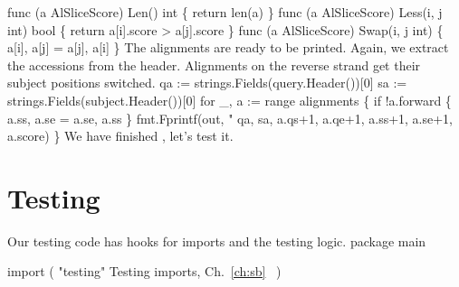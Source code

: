 \nwenddocs{}\plusendmoddef\nwstartdeflinemarkup{}\nwenddeflinemarkup
func (a AlSliceScore) Len() int \{
          return len(a)
\}
func (a AlSliceScore) Less(i, j int) bool \{
          return a[i].score > a[j].score
\}
func (a AlSliceScore) Swap(i, j int) \{
          a[i], a[j] = a[j], a[i]
\}
\nwendcode{}\nwdocspar
The alignments are ready to be printed. Again, we extract the
accessions from the header. Alignments on the reverse strand get their
subject positions switched.
\nwenddocs{}\endmoddef\nwstartdeflinemarkup{}\nwenddeflinemarkup
qa := strings.Fields(query.Header())[0]
sa := strings.Fields(subject.Header())[0]
for _, a := range alignments \{
          if !a.forward \{
                  a.ss, a.se = a.se, a.ss
          \}
          fmt.Fprintf(out, "%
                  qa, sa, a.qs+1, a.qe+1, a.ss+1, a.se+1, a.score)
\}
\nwendcode{}\nwdocspar
We have finished , let's test it.

\section*{Testing}
Our testing code has hooks for imports and the testing logic.
\nwenddocs{}\endmoddef\nwstartdeflinemarkup\nwenddeflinemarkup
package main

import (
          "testing"
          \LA{}Testing imports, Ch.~\ref{ch:sb}~{\nwtagstyle{}}\RA{}
)


